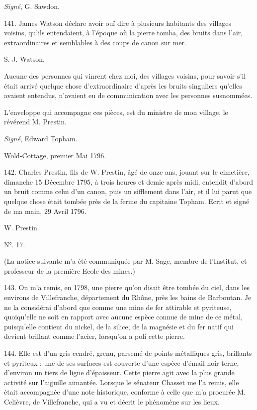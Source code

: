 \documentclass[a4paper, 11pt, oneside, polutonikogreek, french]{article}
\begin{document}
\emph{Signé}, G. Sawdon.

141. James Watson déclare avoir ouï dire à plusieurs habitants des villages voisins, qu'ils entendaient, à l'époque où la pierre tomba, des bruits dans l'air, extraordinaires et semblables à des coups de canon sur mer.

S. J. Watson.

Aucune des personnes qui vinrent chez moi, des villages voisins, pour savoir s'il était arrivé quelque chose d'extraordinaire d'après les bruits singuliers qu'elles avaient entendus, n'avaient eu de communication avec les personnes susnommées.

L'enveloppe qui accompagne ces pièces, est du ministre de mon village, le révérend M. Prestin.

\emph{Signé}, Edward Topham.

Wold-Cottage, premier Mai 1796.

142. Charles Prestin, fils de W. Prestin, âgé de onze ans, jouant sur le cimetière, dimanche 15 Décembre 1795, à trois heures et demie après midi, entendit d'abord un bruit comme celui d'un canon, puis un sifflement dans l'air, et il lui parut que quelque chose était tombée près de la ferme du capitaine Topham. Ecrit et signé de ma main, 29 Avril 1796.

W. Prestin.

\begin{center}
N°. 17.
\end{center}

(La notice suivante m'a été communiquée par M. Sage, membre de l'Institut, et professeur de la première Ecole des mines.)

143. \og On m'a remis, en 1798, une pierre qu'on disait être tombée du ciel, dans les environs de Villefranche, département du Rhône, près les bains de Barboutan. Je ne la considérai d'abord que comme une mine de fer attirable et pyriteuse, quoiqu'elle ne soit en rapport avec aucune espèce connue de mine de ce métal, puisqu'elle contient du nickel, de la silice, de la magnésie et du fer natif qui devient brillant comme l'acier, lorsqu'on a poli cette pierre. \fg

144. \og Elle est d'un gris cendré, grenu, parsemé de points métalliques gris, brillants et pyriteux ; une de ses surfaces est couverte d'une espèce d'émail noir terne, d'environ un tiers de ligne d'épaisseur. Cette pierre agit avec la plus grande activité sur l'aiguille aimantée. Lorsque le sénateur Chasset me l'a remis, elle était accompagnée d'une note historique, conforme à celle que m'a procurée M. Celièvre, de Villefranche, qui a vu et décrit le phénomène sur les lieux. \fg
\end{document}
